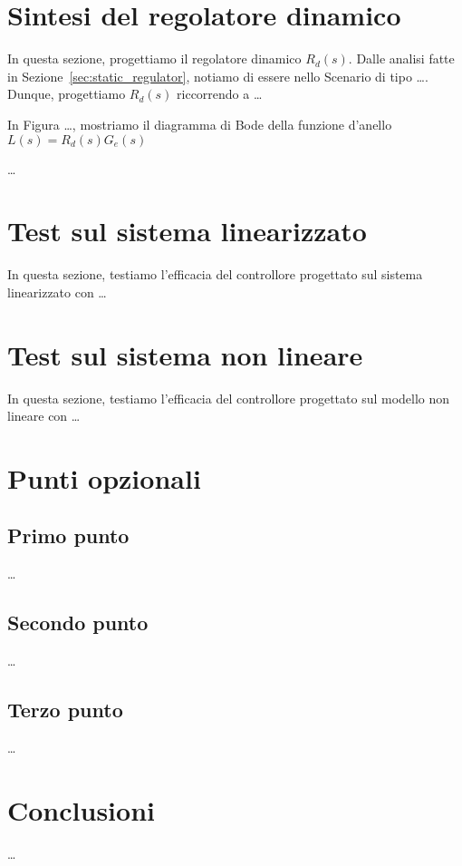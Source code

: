 \documentclass[a4paper, 11pt]{article}
\begin{document}
\section{Sintesi del regolatore dinamico}

In questa sezione, progettiamo il regolatore dinamico $R_d(s)$. 
%
Dalle analisi fatte in Sezione~\ref{sec:static_regulator}, notiamo di essere nello Scenario di tipo \dots. Dunque, progettiamo $R_d(s)$ riccorrendo a \dots


In Figura \dots, mostriamo il diagramma di Bode della funzione d'anello $L(s) = R_d(s) G_e(s)$

\dots

\section{Test sul sistema linearizzato}

In questa sezione, testiamo l'efficacia del controllore progettato sul sistema linearizzato con \dots

\section{Test sul sistema non lineare}

In questa sezione, testiamo l'efficacia del controllore progettato sul modello non lineare con \dots


\section{Punti opzionali}

\subsection{Primo punto}

\dots 

\subsection{Secondo punto}

\dots

\subsection{Terzo punto}

\dots

\section{Conclusioni}

\dots
\end{document}
